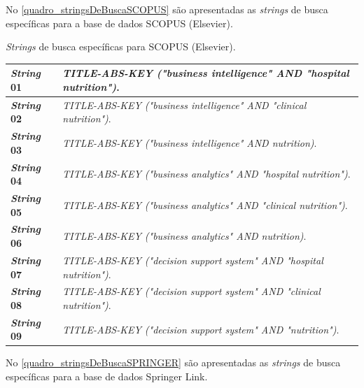No \autoref{quadro_stringsDeBuscaSCOPUS} são apresentadas as \textit{strings} de busca específicas para a base de dados SCOPUS (Elsevier).   

\begin{quadro}[htb]
\caption{\label{quadro_stringsDeBuscaSCOPUS}\textit{Strings} de busca específicas para SCOPUS (Elsevier).}
\label{}
\begin{tabular}{|p{2cm}|p{11cm}|}
	\hline
	\textbf{\textit{String} 01}	& \textit{TITLE-ABS-KEY ("business intelligence" AND "hospital nutrition")}.\\ \hline
	\textbf{\textit{String} 02}	& \textit{TITLE-ABS-KEY ("business intelligence" AND "clinical nutrition")}.\\ \hline
	\textbf{\textit{String} 03}	& \textit{TITLE-ABS-KEY ("business intelligence" AND nutrition)}. \\ \hline
	\textbf{\textit{String} 04}	& \textit{TITLE-ABS-KEY ("business analytics" AND "hospital nutrition")}.	\\ \hline
    \textbf{\textit{String} 05}	& \textit{TITLE-ABS-KEY ("business analytics" AND "clinical nutrition")}. \\ \hline
    \textbf{\textit{String} 06}	& \textit{TITLE-ABS-KEY ("business analytics" AND nutrition)}. \\ \hline
    \textbf{\textit{String} 07}	& \textit{TITLE-ABS-KEY ("decision support system" AND "hospital nutrition")}.\\ \hline
    \textbf{\textit{String} 08}	& \textit{TITLE-ABS-KEY ("decision support system" AND "clinical nutrition")}.\\ \hline
    \textbf{\textit{String} 09}	& \textit{TITLE-ABS-KEY ("decision support system" AND "nutrition")}.\\ \hline
\end{tabular}
\end{quadro}

No \autoref{quadro_stringsDeBuscaSPRINGER} são apresentadas as \textit{strings} de busca específicas para a base de dados Springer Link.
\newline
\newline

